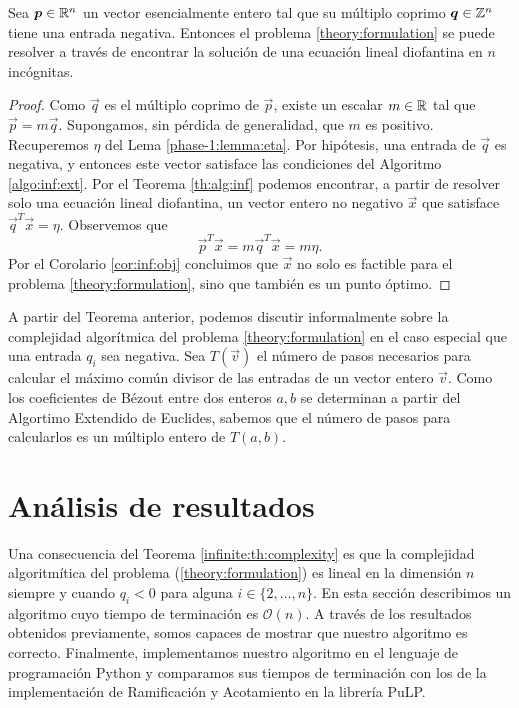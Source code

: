 \begin{theorem}
	\label{infinite:th:complexity}
	Sea $\boldsymbol{p} \in \mathbb{R}^n$ un vector esencialmente entero tal que su múltiplo coprimo $\boldsymbol{q} \in
	\mathbb{Z}^n$ tiene una entrada negativa. Entonces el problema \eqref{theory:formulation} se puede
	resolver a través de encontrar la solución de una ecuación lineal diofantina en $n$ incógnitas.
\end{theorem}
\begin{proof}
	Como $\vec{q}$ es el múltiplo coprimo de $\vec{p}$, existe un escalar $m \in \mathbb{R}$ tal que
	$\vec{p} = m\vec{q}$. Supongamos, sin pérdida de generalidad, que $m$ es positivo. Recuperemos
	$\eta$ del Lema \ref{phase-1:lemma:eta}. Por hipótesis, una entrada de $\vec{q}$ es negativa, y
	entonces este vector satisface las condiciones del Algoritmo \ref{algo:inf:ext}. Por el Teorema
	\ref{th:alg:inf} podemos encontrar, a partir de resolver solo una ecuación lineal diofantina, un
	vector entero no negativo $\vec{x}$ que satisface $\vec{q}^T\vec{x} = \eta$. Observemos que
	\begin{equation*}
		\vec{p}^T\vec{x} = m\vec{q}^T\vec{x} = m\eta.
	\end{equation*}
	Por el Corolario \ref{cor:inf:obj} concluimos que $\vec{x}$ no solo es factible para el problema
	\eqref{theory:formulation}, sino que también es un punto óptimo.
\end{proof}

A partir del Teorema anterior, podemos discutir informalmente sobre la complejidad algorítmica del
problema \eqref{theory:formulation} en el caso especial que una entrada $q_i$ sea negativa. Sea
$T(\vec{v})$ el número de pasos necesarios para calcular el máximo común divisor de las entradas de
un vector entero $\vec{v}$. Como los coeficientes de Bézout entre dos enteros $a, b$ se determinan a
partir del Algortimo Extendido de Euclides, sabemos que el número de pasos para calcularlos es un
múltiplo entero de $T(a, b)$. 

\section{Análisis de resultados}
\noindent
Una consecuencia del Teorema \ref{infinite:th:complexity} es que la complejidad algoritmítica del
problema (\ref{theory:formulation}) es lineal en la dimensión $n$ siempre y cuando $q_i < 0$
para alguna $i \in \lbrace 2, \ldots, n\rbrace$. En esta sección describimos un algoritmo cuyo
tiempo de terminación es $\mathcal{O}(n)$. A través de los resultados obtenidos previamente, somos
capaces de mostrar que nuestro algoritmo es correcto. Finalmente, implementamos nuestro algoritmo en
el lenguaje de programación Python y comparamos sus tiempos de terminación con los de la
implementación de Ramificación y Acotamiento en la librería PuLP. 
